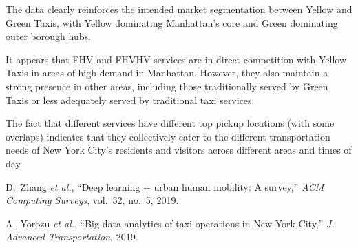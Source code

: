 \documentclass[conference]{IEEEtran}
\begin{document}
The data clearly reinforces the intended market segmentation between Yellow and Green Taxis, with Yellow dominating
Manhattan's core and Green dominating outer borough hubs.

It appears that FHV and FHVHV services are in direct competition with Yellow Taxis in areas of high demand in Manhattan.
However, they also maintain a strong presence in other areas, including those traditionally served by Green Taxis or
less adequately served by traditional taxi services.

The fact that different services have different top pickup locations (with some overlaps) indicates that they
collectively cater to the different transportation needs of New York City's residents and visitors across
different areas and times of day


\begin{thebibliography}{00}

  D.~Zhang \emph{et al.}, “Deep learning + urban human mobility: A survey,”
  \emph{ACM Computing Surveys}, vol.~52, no.~5, 2019.

  A.~Yorozu \emph{et al.}, “Big-data analytics of taxi operations in New York
  City,” \emph{J. Advanced Transportation}, 2019.


\end{thebibliography}
\end{document}
